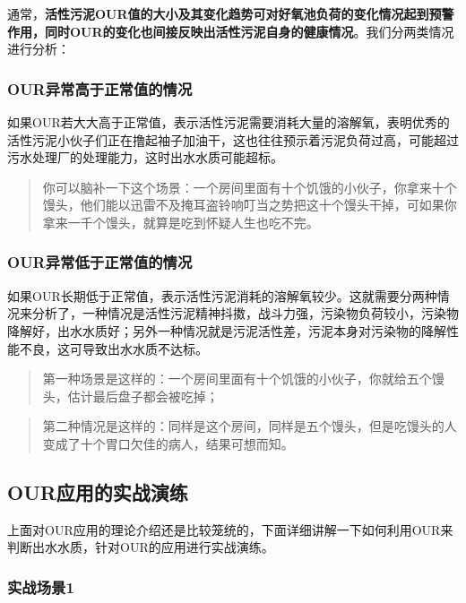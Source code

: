\documentclass[]{book}
\begin{document}
通常，\textbf{活性污泥OUR值的大小及其变化趋势可对好氧池负荷的变化情况起到预警作用，同时OUR的变化也间接反映出活性污泥自身的健康情况}。我们分两类情况进行分析：

\subsubsection{OUR异常高于正常值的情况}\label{our}

如果OUR若大大高于正常值，表示活性污泥需要消耗大量的溶解氧，表明优秀的活性污泥小伙子们正在撸起袖子加油干，这也往往预示着污泥负荷过高，可能超过污水处理厂的处理能力，这时出水水质可能超标。

\begin{quote}
你可以脑补一下这个场景：一个房间里面有十个饥饿的小伙子，你拿来十个馒头，他们能以迅雷不及掩耳盗铃响叮当之势把这十个馒头干掉，可如果你拿来一千个馒头，就算是吃到怀疑人生也吃不完。
\end{quote}

\subsubsection{OUR异常低于正常值的情况}\label{our}

如果OUR长期低于正常值，表示活性污泥消耗的溶解氧较少。这就需要分两种情况来分析了，一种情况是活性污泥精神抖擞，战斗力强，污染物负荷较小，污染物降解好，出水水质好；另外一种情况就是污泥活性差，污泥本身对污染物的降解性能不良，这可导致出水水质不达标。

\begin{quote}
第一种场景是这样的：一个房间里面有十个饥饿的小伙子，你就给五个馒头，估计最后盘子都会被吃掉；
\end{quote}

\begin{quote}
第二种情况是这样的：同样是这个房间，同样是五个馒头，但是吃馒头的人变成了十个胃口欠佳的病人，结果可想而知。
\end{quote}

\subsection{OUR应用的实战演练}\label{our}

上面对OUR应用的理论介绍还是比较笼统的，下面详细讲解一下如何利用OUR来判断出水水质，针对OUR的应用进行实战演练。

\subsubsection{实战场景1}\label{1}
\end{document}
